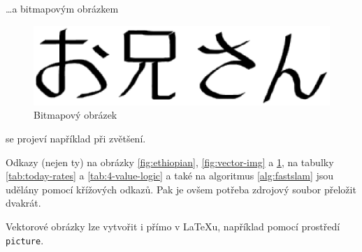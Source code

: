 \documentclass[a4paper, 11pt, final]{article}
\begin{document}
\noindent \dots a bitmapovým obrázkem

\begin{figure}[ht]
    \centering
    \includegraphics[scale=0.6]{./oniisan2}
    \caption{Bitmapový obrázek}
    \label{fig:bitmap-img}
\end{figure}

\noindent se projeví například při zvětšení.

Odkazy (nejen ty) na obrázky \ref{fig:ethiopian}, \ref{fig:vector-img} a \ref{fig:bitmap-img}, na tabulky \ref{tab:today-rates} a \ref{tab:4-value-logic} a také na algoritmus \ref{alg:fastslam} jsou udělány pomocí 
křížových odkazů. Pak je ovšem potřeba zdrojový soubor přeložit dvakrát.

Vektorové obrázky lze vytvořit i přímo v \LaTeX{}u, například pomocí prostředí 
\texttt{picture}.
\end{document}
